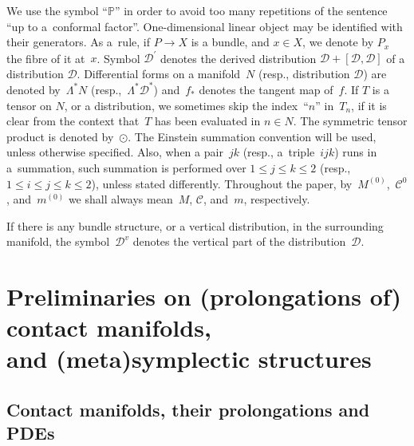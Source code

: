 \documentclass[10pt,a4paper]{amsart}
\newcommand{\C}{\mathcal{C}}
\newcommand{\D}{\mathcal{D}}
\renewcommand{\P}{\mathbb{P}}
\numberwithin{equation}{section}
\begin{document}
We use the symbol ``$\P$'' in order to avoid too many repetitions of the sentence ``up to a~conformal factor''.
One-dimensional linear object may be identif\/ied with their generators. As a~rule, if $P\to X$ is a bundle, and $x\in X$, we denote by $P_x$ the f\/ibre of it at~$x$. Symbol $\D^\prime$ denotes the derived distribution $\D+[\D,\D]$ of a distribution $\D$. Dif\/ferential forms on a mani\-fold~$N$ (resp., distribution $\D$) are denoted by~$\Lambda^\ast N$ (resp.,~$\Lambda^\ast \D^\ast$) and~$f_\ast$ denotes the tangent map of~$f$.
If $T$ is a tensor on $N$, or a distribution, we sometimes skip the index~``$n$'' in~$T_n$, if it is clear from the context that~$T$ has been evaluated in $n\in N$.
 The symmetric tensor product is denoted by~$\odot$.
The Einstein summation convention will be used, unless otherwise specif\/ied. Also, when a pair~$jk$ (resp., a~triple~$ijk$) runs in a~summation, such summation is performed over $1\leq j\leq k\leq 2$ (resp., $1\leq i\leq j\leq k\leq 2$), unless stated dif\/ferently.
Throughout the paper, by~$M^{(0)}$,~$\C^0$, and~$m^{(0)}$ we shall always mean~$M$, $\C$, and~$m$, respectively.

\begin{Remark}\label{remVerticale}
 If there is any bundle structure, or a vertical distribution, in the surrounding manifold, the symbol~$\D^v$ denotes the vertical part of the distribution~$\D$.
\end{Remark}

\section[Preliminaries on (prolongations of) contact manifolds, and (meta)symplectic structures]{Preliminaries on (prolongations of) contact manifolds,\\ and (meta)symplectic structures}\label{SecPrelim}

\subsection{Contact manifolds, their prolongations and PDEs}\label{sec.definitions.contact.and.prol}
\end{document}
